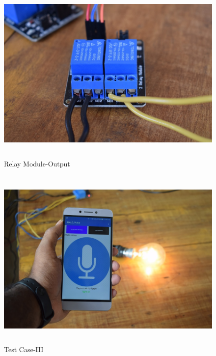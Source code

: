 \begin{figure}[H]
	
	\centering
	\includegraphics[width=\linewidth,height=9cm] {./images/p30.jpg}
	\caption{Relay Module-Output}
	\label{manual}
\end{figure}

\begin{figure}[H]
	
	\centering
	\includegraphics[width=\linewidth,height=9cm] {./images/p31.jpg}
	\caption{Test Case-III}
	\label{manual}
\end{figure}

